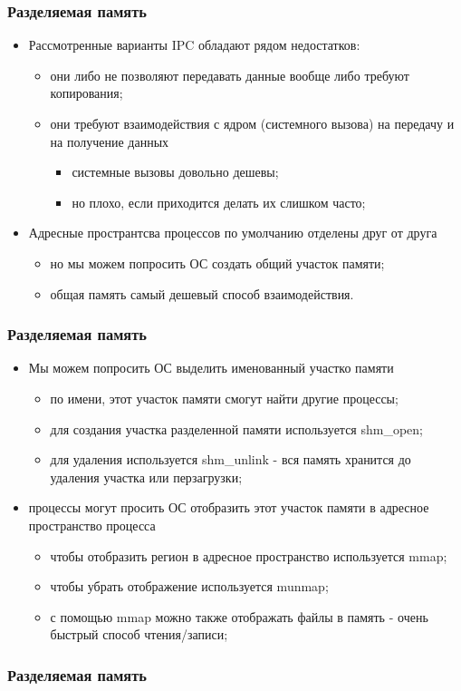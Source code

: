 \begin{frame}
\frametitle{Разделяемая память}

\begin{itemize}
  \item<1-> Рассмотренные варианты IPC обладают рядом недостатков:
    \begin{itemize}
      \item они либо не позволяют передавать данные вообще либо требуют копирования;
      \item они требуют взаимодействия с ядром (системного вызова) на передачу и на получение данных
        \begin{itemize}
          \item системные вызовы довольно дешевы;
          \item но плохо, если приходится делать их слишком часто;
        \end{itemize}
    \end{itemize}
  \item<2-> Адресные пространтсва процессов по умолчанию отделены друг от друга
    \begin{itemize}
      \item но мы можем попросить ОС создать общий участок памяти;
      \item общая память самый дешевый способ взаимодействия.
    \end{itemize}
\end{itemize}
\end{frame}

\begin{frame}
\frametitle{Разделяемая память}

\begin{itemize}
  \item<1-> Мы можем попросить ОС выделить именованный участко памяти
    \begin{itemize}
      \item по имени, этот участок памяти смогут найти другие процессы;
      \item для создания участка разделенной памяти используется shm\_open;
      \item для удаления используется shm\_unlink - вся память хранится до удаления участка или перзагрузки;
    \end{itemize}
  \item<2-> процессы могут просить ОС отобразить этот участок памяти в адресное пространство процесса
    \begin{itemize}
      \item чтобы отобразить регион в адресное пространство используется mmap;
      \item чтобы убрать отображение используется munmap;
      \item с помощью mmap можно также отображать файлы в память - очень быстрый способ чтения/записи;
    \end{itemize}
\end{itemize}
\end{frame}

\begin{frame}[fragile]
\frametitle{Разделяемая память}

\end{frame}
